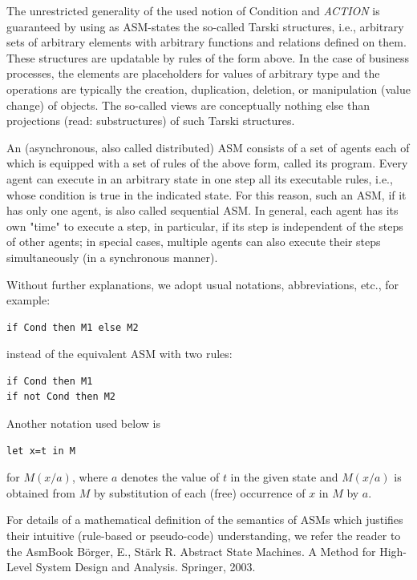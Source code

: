 The unrestricted generality of the used notion of Condition and \textit{ACTION} is guaranteed by using as ASM-states the so-called Tarski structures, i.e., arbitrary sets of arbitrary elements with arbitrary functions and relations defined on them. These structures are updatable by rules of the form above. In the case of business processes, the elements are placeholders for values of arbitrary type and the operations are typically the creation, duplication, deletion, or manipulation (value change) of objects. The so-called views are conceptually nothing else than projections (read: substructures) of such Tarski structures.

An (asynchronous, also called distributed) ASM consists of a set of agents each of which is equipped with a set of rules of the above form, called its program. Every agent can execute in an arbitrary state in one step all its executable rules, i.e., whose condition is true in the indicated state. For this reason, such an ASM, if it has only one agent, is also called sequential ASM. In general, each agent has its own "time" to execute a step, in particular, if its step is independent of the steps of other agents;  in special cases, multiple agents can also execute their steps simultaneously (in a synchronous manner).

Without further explanations, we adopt usual notations, abbreviations, etc., for example:



\begin{lstlisting}
if Cond then M1 else M2
\end{lstlisting}

instead of the equivalent ASM with two rules:

\begin{lstlisting}
if Cond then M1
if not Cond then M2
\end{lstlisting}

Another notation used below is

\begin{lstlisting}
let x=t in M
\end{lstlisting}

for $M(x/a)$, where $a$ denotes the value of $t$ in the given state and $M(x/a)$ is obtained from $M$ by substitution of each (free) occurrence of $x$ in $M$ by $a$.

For details of a mathematical definition of the semantics of ASMs which justifies their intuitive (rule-based or pseudo-code) understanding, we refer the reader to the AsmBook Börger, E., Stärk R. Abstract State Machines. A Method for High-Level System Design and Analysis. Springer, 2003.





